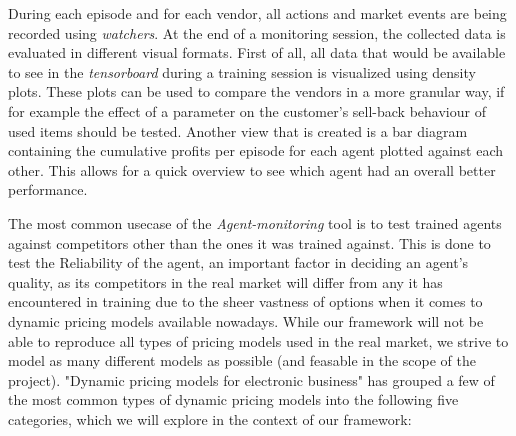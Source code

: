 During each episode and for each vendor, all actions and market events are being recorded using \emph{watchers}. At the end of a monitoring session, the collected data is evaluated in different visual formats. First of all, all data that would be available to see in the \emph{tensorboard} during a training session is visualized using density plots. These plots can be used to compare the vendors in a more granular way, if for example the effect of a parameter on the customer's sell-back behaviour of used items should be tested. Another view that is created is a bar diagram containing the cumulative profits per episode for each agent plotted against each other. This allows for a quick overview to see which agent had an overall better performance.

The most common usecase of the \emph{Agent-monitoring} tool is to test trained agents against competitors other than the ones it was trained against. This is done to test the Reliability of the agent, an important factor in deciding an agent's quality, as its competitors in the real market will differ from any it has encountered in training due to the sheer vastness of options when it comes to dynamic pricing models available nowadays. While our framework will not be able to reproduce all types of pricing models used in the real market, we strive to model as many different models as possible (and feasable in the scope of the project). "Dynamic pricing models for electronic business" \cite{dynamicPricingModels} has grouped a few of the most common types of dynamic pricing models into the following five categories, which we will explore in the context of our framework:


